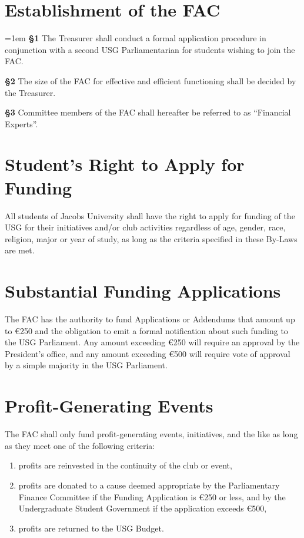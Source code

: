 \documentclass[12pt]{LaTeX_Misc/constitution}
\begin{document}
\section{Establishment of the FAC}\label{fin:establishment}
{\parindent=1em
\textbf{\S{}1} The Treasurer shall conduct a formal application procedure in conjunction with a second USG Parliamentarian for students wishing to join the FAC.

\textbf{\S{}2} The size of the FAC for effective and efficient functioning shall be decided by the Treasurer. 

\textbf{\S{}3} Committee members of the FAC shall hereafter be referred to as ``Financial Experts''.}


\section{Student's Right to Apply for Funding}
All students of Jacobs University shall have the right to apply for funding of the USG for their initiatives and/or club activities regardless of age, gender, race, religion, major or year of study, as long as the criteria specified in these By-Laws are met.

\section{Substantial Funding Applications}
The FAC has the authority to fund Applications or Addendums that amount up to $\euro$250 and the obligation to emit a formal notification about such funding to the USG Parliament. Any amount exceeding $\euro$250 will require an approval by the President's office, and any amount exceeding $\euro$500 will require vote of approval by a simple majority in the USG Parliament.

\section{Profit-Generating Events}
The FAC shall only fund profit-generating events, initiatives, and the like as long as they meet one of the following criteria:
\begin{enumerate}
    \item profits are reinvested in the continuity of the club or event,
	\item profits are donated to a cause deemed appropriate by the Parliamentary Finance Committee if the Funding Application is $\euro$250 or less, and by the Undergraduate Student Government if the application exceeds $\euro$500,
	\item profits are returned to the USG Budget.
\end{enumerate}
\end{document}
